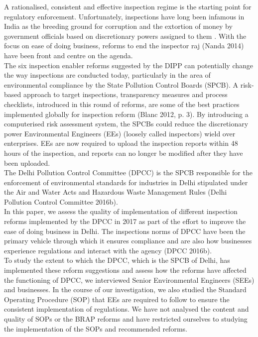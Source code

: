 \documentclass[a4paper, 12pt]{article}
\begin{document}
                  A rationalised, consistent and effective inspection regime is the starting point for regulatory enforcement. Unfortunately, inspections have long been infamous in India as the breeding ground for corruption and the extortion of money by government officials based on discretionary powers assigned to them \parencite{PHD}. With the focus on ease of doing business, reforms to end the inspector raj (Nanda 2014) have been front and centre on the agenda. \\
                  
                  The six inspection enabler reforms suggested by the DIPP can potentially change the way inspections are conducted today, particularly in the area of environmental compliance by the State Pollution Control Boards (SPCB). A risk-based approach to target inspections, transparency measures and process checklists, introduced in this round of reforms, are some of the best practices implemented globally for inspection reform (Blanc 2012, p. 3). By introducing a computerised risk assessment system, the SPCBs could reduce the discretionary power Environmental Engineers (EEs) (loosely called inspectors) wield over enterprises. EEs are now required to upload the inspection reports within 48 hours of the inspection, and reports can no longer be modified after they have been uploaded. \\
                  
                 The Delhi Pollution Control Committee (DPCC) is the SPCB responsible for the enforcement of environmental standards for industries in Delhi stipulated under the Air and Water Acts and Hazardous Waste Management Rules \parencite{DPCCb}(Delhi Pollution Control Committee 2016b). \\
                 
                 In this paper, we assess the quality of implementation of different inspection reforms implemented by the DPCC in 2017 as part of the effort to improve the ease of doing business in Delhi. The inspections norms of DPCC have been the primary vehicle through which it ensures compliance and are also how businesses experience regulations and interact with the agency (DPCC 2016b). \\
                 
                 To study the extent to which the DPCC, which is the SPCB of Delhi, has implemented these reform suggestions and assess how the reforms have affected the functioning of DPCC, we interviewed Senior Environmental Engineers (SEEs) and businesses. In the course of our investigation, we also studied the Standard Operating Procedure (SOP) that EEs are required to follow to ensure the consistent implementation of regulations. We have not analysed the content and quality of SOPs or the BRAP reforms and have restricted ourselves to studying the implementation of the SOPs and recommended reforms. \\
                 
\end{document}
